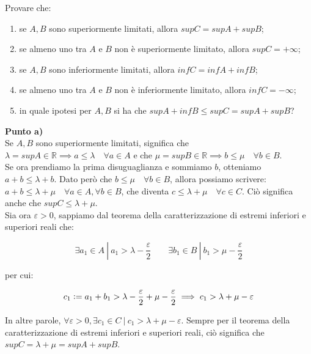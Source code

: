\documentclass{article}
\begin{document}
\noindent Provare che: 

\begin{enumerate}[label=\alph*)]
    \item se $A, B$ sono superiormente limitati, allora $supC = supA + supB$;
    \item se almeno uno tra $A$ e $B$ non è superiormente limitato, allora $supC = + \infty$;
    \item se $A, B$ sono inferiormente limitati, allora $infC = infA + infB$;
    \item se almeno uno tra $A$ e $B$ non è inferiormente limitato, allora $infC = - \infty$;
    \item in quale ipotesi per $A, B$ si ha che $supA + infB \leq supC = supA + supB$?
\end{enumerate}

\noindent \textbf{Punto a)}\\

\noindent Se $A, B$ sono superiormente limitati, significa che $\lambda = supA \in \mathbb{R} \implies a \leq \lambda \quad \forall a \in A$ e che $\mu = supB \in \mathbb{R} \implies b \leq \mu \quad \forall b \in B$. \\
Se ora prendiamo la prima disuguaglianza e sommiamo $b$, otteniamo $a + b \leq \lambda + b$. Dato però che $b \leq \mu \quad \forall b \in B$, allora possiamo scrivere: $a + b \leq \lambda + \mu \quad \forall a \in A, \forall b \in B$, che diventa $c \leq \lambda + \mu \quad \forall c \in C$. Ciò significa anche che $supC \leq \lambda + \mu$.\\
Sia ora $\varepsilon > 0$, sappiamo dal teorema della caratterizzazione di estremi inferiori e superiori reali che:

\begin{equation*}
    \exists a_1 \in A \ | \ a_1 > \lambda - \frac{\varepsilon}{2} \qquad \exists b_1 \in B \ | \ b_1 > \mu - \frac{\varepsilon}{2}
\end{equation*}

\noindent per cui:

\begin{equation*}
    c_1 \vcentcolon = a_1 + b_1 > \lambda - \frac{\varepsilon}{2} + \mu - \frac{\varepsilon}{2} \implies c_1 > \lambda + \mu - \varepsilon
\end{equation*}

\noindent In altre parole, $\forall \varepsilon > 0, \exists c_1 \in C \ | \ c_1 > \lambda + \mu - \varepsilon$. Sempre per il teorema della caratterizzazione di estremi inferiori e superiori reali, ciò significa che $supC = \lambda + \mu = supA + supB$.\\
\end{document}
